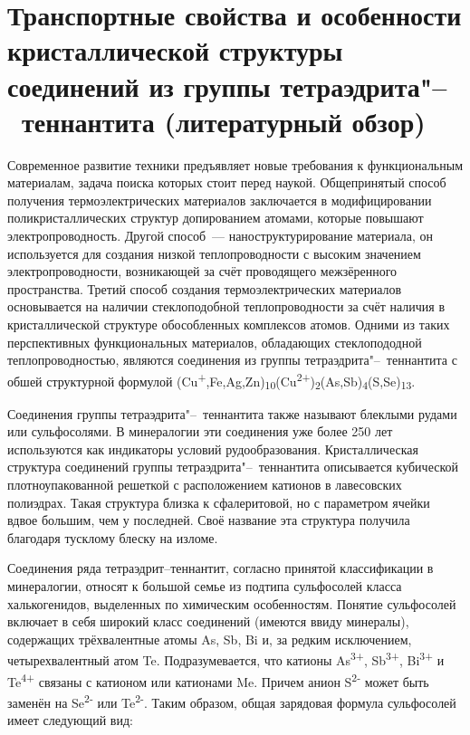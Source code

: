 \chapter{Транспортные свойства и особенности кристаллической структуры соединений из группы тетраэдрита"--~теннантита (литературный обзор)} \label{chapt1}

Современное развитие техники предъявляет новые требования к функциональным материалам, задача поиска которых стоит перед наукой. Общепринятый способ получения термоэлектрических материалов заключается в модифицировании поликристаллических структур допированием атомами, которые повышают электропроводность. Другой способ~--- наноструктурирование материала, он используется для создания низкой теплопроводности с высоким значением электропроводности, возникающей за счёт проводящего межзёренного пространства. Третий способ создания термоэлектрических материалов основывается на наличии стеклоподобной теплопроводности за счёт наличия в кристаллической структуре обособленных комплексов атомов. Одними из таких перспективных функциональных материалов, обладающих стеклопододной теплопроводностью, являются соединения из группы тетраэдрита"--~теннантита с обшей структурной формулой (Cu\textsuperscript{+},Fe,Ag,Zn)\textsubscript{10}(Cu\textsuperscript{2+})\textsubscript{2}(As,Sb)\textsubscript{4}(S,Se)\textsubscript{13}.

Соединения группы тетраэдрита"--~теннантита также называют блеклыми рудами или сульфосолями. В минералогии эти соединения уже более 250 лет используются как индикаторы условий рудообразования. Кристаллическая структура соединений группы тетраэдрита"--~теннантита описывается кубической плотноупакованной решеткой с расположением катионов в лавесовских полиэдрах. Такая структура близка к сфалеритовой, но с параметром ячейки вдвое большим, чем у последней. Своё название эта структура получила благодаря тусклому блеску на изломе.

Соединения ряда тетраэдрит--теннантит, согласно принятой классификации в минералогии\cite{Molo2008}, относят к большой семье из подтипа сульфосолей класса халькогенидов, выделенных по химическим особенностям.
Понятие сульфосолей включает в себя широкий класс соединений (имеются ввиду минералы), содержащих трёхвалентные атомы As, Sb, Bi и, за редким исключением, четырехвалентный атом Te.
Подразумевается, что катионы As\textsuperscript{3+}, Sb\textsuperscript{3+}, Bi\textsuperscript{3+} и Te\textsuperscript{4+} связаны с катионом или катионами Me.
Причем анион  S\textsuperscript{2-} может быть заменён на Se\textsuperscript{2-} или Te\textsuperscript{2-}. Таким образом, общая зарядовая формула сульфосолей имеет следующий вид:

